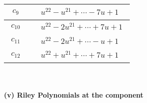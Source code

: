 \documentclass[1p]{elsarticle_modified}
\theoremstyle{definition}
\begin{document}
\begin{tabular}{m{50pt}|m{274pt}}
\hline $$\begin{aligned}c_{9}\end{aligned}$$&$\begin{aligned}
&u^{22}- u^{21}+\cdots-7 u+1
\end{aligned}$\\
\hline $$\begin{aligned}c_{10}\end{aligned}$$&$\begin{aligned}
&u^{22}-2 u^{21}+\cdots+7 u+1
\end{aligned}$\\
\hline $$\begin{aligned}c_{11}\end{aligned}$$&$\begin{aligned}
&u^{22}-2 u^{21}+\cdots- u+1
\end{aligned}$\\
\hline $$\begin{aligned}c_{12}\end{aligned}$$&$\begin{aligned}
&u^{22}+u^{21}+\cdots+7 u+1
\end{aligned}$\\
\hline
\end{tabular}\\~\\
\newpage\renewcommand{\arraystretch}{1}
\flushleft \textbf{(v) Riley Polynomials at the component}\newline \\
\end{document}
